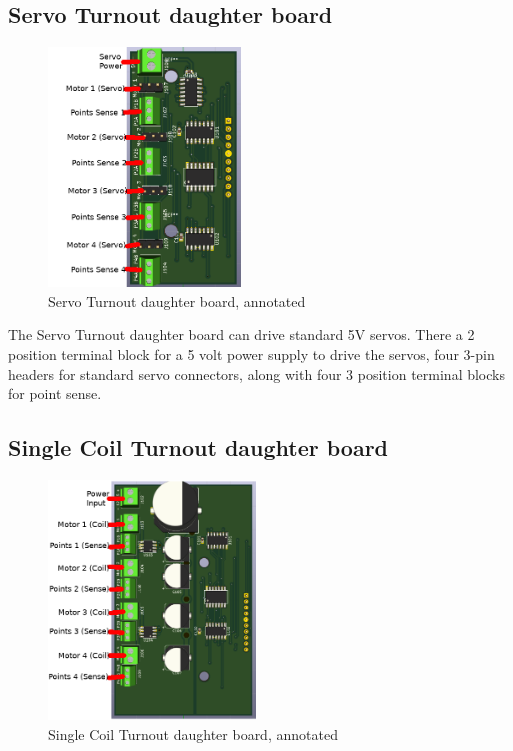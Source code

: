 \documentclass[12pt,twoside]{article}
\begin{document}
\subsection{Servo Turnout daughter board}
\label{sect:TS-Daughter}
\begin{figure}[hbpt]\begin{centering}%
\includegraphics[height=2.5in]{TS-DaughterBoard-Annotated.png}
\caption{Servo Turnout daughter board, annotated}
\end{centering}\end{figure}

The Servo Turnout daughter board can drive standard 5V servos. There a 2
position terminal block for a 5 volt power supply to drive the servos, four
3-pin headers for standard servo connectors, along with four 3 position
terminal blocks for point sense.

\subsection{Single Coil Turnout daughter board}
\label{sect:SC-Daughter}
\begin{figure}[hbpt]\begin{centering}%
\includegraphics[height=2.5in]{SC-DaughterBoard-Annotated.png}
\caption{Single Coil Turnout daughter board, annotated}
\end{centering}\end{figure}
\end{document}
